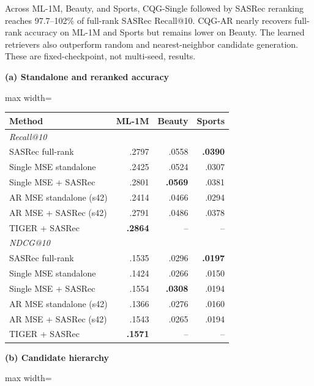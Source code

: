 \documentclass[preprint,12pt]{elsarticle}
\begin{document}
Across ML-1M, Beauty, and Sports, CQG-Single followed by SASRec reranking
reaches 97.7--102\% of full-rank SASRec Recall@10. CQG-AR nearly recovers
full-rank accuracy on ML-1M and Sports but remains lower on Beauty. The
learned retrievers also outperform random and nearest-neighbor candidate
generation. These are fixed-checkpoint, not multi-seed, results.

\begin{table}[htbp]
\centering
\small
\begin{minipage}[t]{0.625\textwidth}
\centering
\textbf{(a) Standalone and reranked accuracy}\\[2pt]
\setlength{\tabcolsep}{2.2pt}
\begin{adjustbox}{max width=\linewidth}
\begin{tabular}{lrrr}
\toprule
Method & ML-1M & Beauty & Sports \\
\midrule
\multicolumn{4}{l}{\textit{Recall@10}} \\
SASRec full-rank & .2797 & .0558 & \textbf{.0390} \\
Single MSE standalone & .2425 & .0524 & .0307 \\
Single MSE + SASRec & .2801 & \textbf{.0569} & .0381 \\
AR MSE standalone (s42) & .2414 & .0466 & .0294 \\
AR MSE + SASRec (s42) & .2791 & .0486 & .0378 \\
TIGER + SASRec & \textbf{.2864} & -- & -- \\
\midrule
\multicolumn{4}{l}{\textit{NDCG@10}} \\
SASRec full-rank & .1535 & .0296 & \textbf{.0197} \\
Single MSE standalone & .1424 & .0266 & .0150 \\
Single MSE + SASRec & .1554 & \textbf{.0308} & .0194 \\
AR MSE standalone (s42) & .1366 & .0276 & .0160 \\
AR MSE + SASRec (s42) & .1543 & .0265 & .0194 \\
TIGER + SASRec & \textbf{.1571} & -- & -- \\
\bottomrule
\end{tabular}
\end{adjustbox}
\end{minipage}\hfill
\begin{minipage}[t]{0.36\textwidth}
\centering
\textbf{(b) Candidate hierarchy}\\[2pt]
\setlength{\tabcolsep}{2.2pt}
\begin{adjustbox}{max width=\linewidth}

\end{adjustbox}
\end{minipage}
\end{table}
\end{document}

